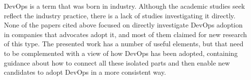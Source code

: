 DevOps is a term that was born in industry. Although the academic studies seek reflect the industry practice, there is a lack of studies investigating it directly. None of the papers cited above focused on directly investigate DevOps adoption in companies that advocates adopt it, and most of them claimed for new research of this type. The presented work has a number of useful elements, but that need to be complemented with a view of how DevOps has been adopted, containing guidance about how to connect all these isolated parts and then enable new candidates to adopt DevOps in a more consistent way.
